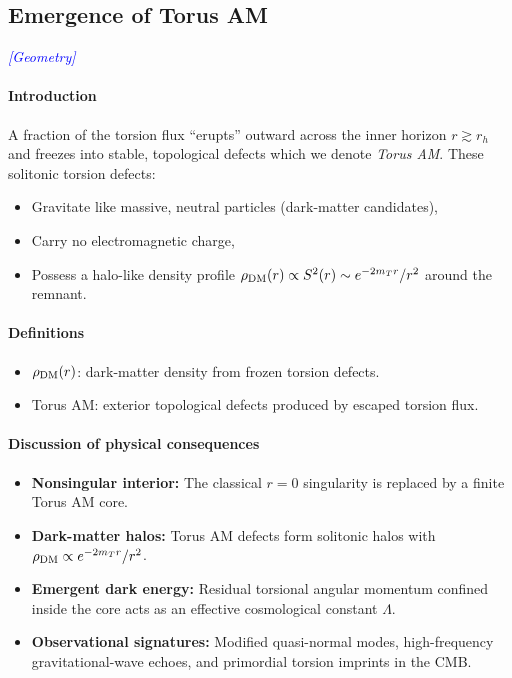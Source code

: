 \documentclass{article}
\newcommand{\TorsionProfile}{S^2(r)}
\newcommand{\geometrytag}{\textcolor{blue}{\textit{[Geometry]}}}
\begin{document}
\subsection{Emergence of Torus AM}
\label{sec:emergence-torus-prime}
\geometrytag

\paragraph{Introduction}
A fraction of the torsion flux “erupts” outward across the inner horizon \(r\gtrsim r_h\) and
freezes into stable, topological defects which we denote \emph{Torus AM}.  These solitonic
torsion defects:

\begin{itemize}
  \item Gravitate like massive, neutral particles (dark-matter candidates),
  \item Carry no electromagnetic charge,
  \item Possess a halo-like density profile
    \(\rho_{\rm DM}(r)\propto \TorsionProfile\sim e^{-2m_T r}/r^2\)
    around the remnant.
\end{itemize}

\paragraph{Definitions}
\begin{itemize}
  \item \(\rho_{\rm DM}(r)\): dark-matter density from frozen torsion defects.
  \item Torus AM: exterior topological defects produced by escaped torsion flux.
\end{itemize}

\paragraph{Discussion of physical consequences}
\begin{itemize}
  \item \textbf{Nonsingular interior:} The classical \(r=0\) singularity is replaced by a finite Torus AM core.
  \item \textbf{Dark-matter halos:} Torus AM defects form solitonic halos with
    \(\rho_{\rm DM}\propto e^{-2m_T r}/r^2\).
  \item \textbf{Emergent dark energy:} Residual torsional angular momentum confined inside the core
    acts as an effective cosmological constant \(\Lambda\).
  \item \textbf{Observational signatures:} Modified quasi-normal modes, high-frequency gravitational-wave
    echoes, and primordial torsion imprints in the CMB.
\end{itemize}
\end{document}
